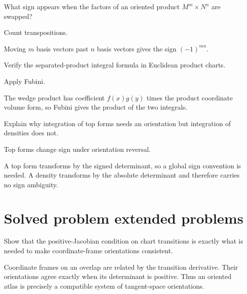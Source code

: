 \begin{exercise}\label{exr:vii10-22}
What sign appears when the factors of an oriented product $M^m\times N^n$ are swapped?
\end{exercise}
\begin{hint}
Count transpositions.
\end{hint}
\begin{solution}
Moving $m$ basis vectors past $n$ basis vectors gives the sign $(-1)^{mn}$.
\end{solution}

\begin{exercise}\label{exr:vii10-23}
Verify the separated-product integral formula in Euclidean product charts.
\end{exercise}
\begin{hint}
Apply Fubini.
\end{hint}
\begin{solution}
The wedge product has coefficient $f(x)g(y)$ times the product coordinate volume form, so Fubini gives the product of the two integrals.
\end{solution}

\begin{exercise}\label{exr:vii10-24}
Explain why integration of top forms needs an orientation but integration of densities does not.
\end{exercise}
\begin{hint}
Top forms change sign under orientation reversal.
\end{hint}
\begin{solution}
A top form transforms by the signed determinant, so a global sign convention is needed. A density transforms by the absolute determinant and therefore carries no sign ambiguity.
\end{solution}


\section{Solved problem extended problems}

\begin{problem}\label{prob:vii10-01}
Show that the positive-Jacobian condition on chart transitions is exactly what is needed to make coordinate-frame orientations consistent.
\end{problem}
\begin{solution}
Coordinate frames on an overlap are related by the transition derivative. Their orientations agree exactly when its determinant is positive. Thus an oriented atlas is precisely a compatible system of tangent-space orientations.
\end{solution}

